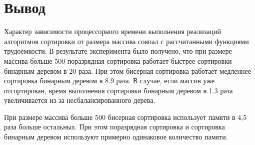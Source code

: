 
\section{Вывод}
Характер зависимости процессорного времени выполнения реализаций алгоритмов сортировки от размера массива совпал с рассчитанными функциями трудоёмкости.
В результате эксперимента было получено, что при размере массива больше 500 поразрядная сортировка работает быстрее сортировки бинарным деревом в 20 раза.
При этом бисерная сортировка работает медленнее сортировка бинарным деревом в 8.9 раза.
В случае, если массив уже отсортирован, время выполнения сортировки бинарным деревом в 1.3 раза увеличивается из-за несбалансированного дерева.

При размере массива больше 500 бисерная сортировка использует памяти в 4,5 раза больше остальных.
При этом поразрядная сортировка и сортировка бинарным деревом используют примерно одинаковое количество памяти.